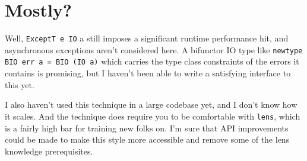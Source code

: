 \section{Mostly?}

Well, \texttt{ExceptT e IO} a still imposes a significant runtime performance hit, and asynchronous exceptions aren't considered here. A bifunctor IO type like \texttt{newtype BIO err a = BIO (IO a)} which carries the type class constraints of the errors it contains is promising, but I haven't been able to write a satisfying interface to this yet.

I also haven't used this technique in a large codebase yet, and I don't know how it scales. And the technique does require you to be comfortable with \texttt{lens}, which is a fairly high bar for training new folks on. I'm sure that API improvements could be made to make this style more accessible and remove some of the lens knowledge prerequisites.
